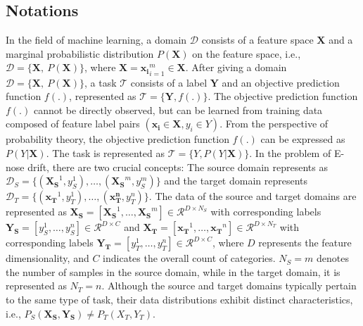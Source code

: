 \documentclass[a4paper]{cas-sc}
\begin{document}
\subsection{Notations}\label{not}
In the field of machine learning, a domain $\mathcal{D}$ consists of a feature space $\mathcal{\boldsymbol{X}}$ and a marginal probabilistic distribution $P(\boldsymbol{\boldsymbol{X}})$ on the feature space, i.e., $\mathcal{D} = \{ \mathcal{\boldsymbol{X}},\ P(\boldsymbol{\boldsymbol{X}})\}$, where $\boldsymbol{\boldsymbol{X}} = \boldsymbol{\boldsymbol{x_i}}_{i=1}^m \in \mathcal{\boldsymbol{X}}$.
After giving a domain $\mathcal{D} = \{ \mathcal{\boldsymbol{X}},\ P(\boldsymbol{\boldsymbol{X}})\}$,
a task $\mathcal{T}$ consists of a label $\boldsymbol{Y}$ and an objective prediction function $f(.)$, represented as $\mathcal{T} = \{\boldsymbol{Y}, f(.)\}$. The objective prediction function $f(.)$ cannot be directly observed, but can be learned from training data composed of feature label pairs $(\boldsymbol{x_i}\in \boldsymbol{X}, y_i\in Y)$. From the perspective of probability theory, the objective prediction function $f(.)$ can be expressed as $P (Y | \boldsymbol{X})$. The task is represented as $\mathcal{T}=\{Y, P (Y | \boldsymbol{X})\}$. In the problem of E-nose drift, there are two crucial concepts: The source domain represents as $\mathcal{D}_{S} = \{(\boldsymbol{X_S}^{1},y_{S}^{1}),\ldots,(\boldsymbol{X_S}^{m},y_{S}^{m})\}$ and the target domain represents $\mathcal{D}_{T} = \{(\boldsymbol{x_{T}}^{1},y_{T}^{1}),\ldots,(\boldsymbol{x_{T}^{n}},y_{T}^{n})\}$. The data of the source and target domains are represented as $\boldsymbol{X_S} = [\boldsymbol{X_S}^{1},\ldots,\boldsymbol{X_S}^{m}]\in \mathcal{R}^{D\times N_S}$ with corresponding labels $\boldsymbol{Y_S} = [y_{S}^{1},\ldots,y_{S}^{n}]\in \mathcal{R}^{D\times C}$ and $\boldsymbol{X_T} = [\boldsymbol{x_{T}}^{1},\ldots,\boldsymbol{x_{T}}^{n}]\in \mathcal{R}^{D\times N_T}$ with corresponding labels $\boldsymbol{Y_T} = [y_{T}^{1},\ldots,y_{T}^{n}]\in \mathcal{R}^{D\times C}$, where $D$ represents the feature dimensionality, and $C$ indicates the overall count of categories.
$N_S = m$ denotes the number of samples in the source domain, while in the target domain, it is represented as $N_T = n$. Although the source and target domains typically pertain to the same type of task, their data distributions exhibit distinct characteristics, i.e., $P_S(\boldsymbol{X_S},\boldsymbol{Y_S}) \neq P_T(X_T,Y_T)$.
\end{document}
